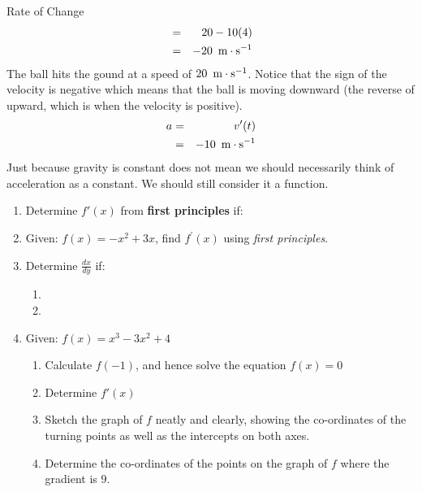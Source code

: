 \begin{wex}{Rate of Change}
{\begin{eqnarray*}
&=& 20 - 10(4)\\
&=& -20~\,\mathrm{m \cdot s^{-1}}\\
\end{eqnarray*}
The ball hits the gound at a speed of $20~\,\mathrm{m \cdot s^{-1}}$. Notice that the sign of the velocity is negative which means that the ball is moving downward (the reverse of upward, which is when the velocity is positive).
\begin{eqnarray*}
a &=& v'(t)\\
&=& -10 ~\,\mathrm{m \cdot s^{-1}}
\end{eqnarray*}
Just because gravity is constant does not mean we should necessarily think of acceleration as a constant. We should still consider it a function.
}
\end{wex}


\begin{eocexercises}{}
\begin{enumerate}

\item{Determine $f'(x)$ from \textbf{first principles} if:
\begin{enumerate}
\end{enumerate}}

\item{Given: \quad $f(x) = -x^2 + 3x$, find $f^{\prime}(x)$ using \textit{first principles}.}

\item{Determine $\frac{dx}{dy}$ if:
\begin{enumerate}
\item{}
\item{}
\end{enumerate}}

\item{Given: $f(x) =x^3 - 3x^2 + 4$
\begin{enumerate}
\item{Calculate $f(-1)$, and hence solve the equation $f(x)=0$}
\item{Determine $f'(x)$}
\item{Sketch the graph of $f$ neatly and clearly, showing the co-ordinates of the turning points as well as the intercepts on both axes.}
\item{Determine the co-ordinates of the points on the graph of $f$  where the gradient is $9$.}
\end{enumerate}}


\end{enumerate}
\end{eocexercises}

